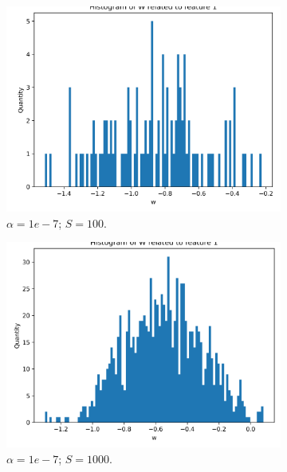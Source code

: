 \documentclass{article}
\begin{document}
\begin{figure}
  \centering
  \begin{subfigure}[t]{0.24\textwidth}
    \centering
    \includegraphics[width=\linewidth]{hist_feat0_1_sample_100.png}
    \caption{$\alpha = 1e-7$; $S = 100$.}
  \end{subfigure}
  \hfill
  \begin{subfigure}[t]{0.24\textwidth}
    \centering
    \includegraphics[width=\linewidth]{hist_feat0_1_sample_1000.png}
    \caption{$\alpha = 1e-7$; $S = 1000$.}
  \end{subfigure}
  \hfill
  \begin{subfigure}[t]{0.24\textwidth}
    \centering

\end{subfigure}
\end{figure}
\end{document}
